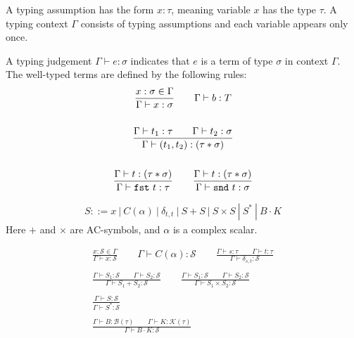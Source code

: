 \begin{definition}
  A typing assumption has the form $x : \tau$, meaning variable $x$ has the type $\tau$. A typing context $\Gamma$ consists of typing assumptions and each variable appears only once.

  A typing judgement $\Gamma \vdash e : \sigma$ indicates that $e$ is a term of type $\sigma$ in context $\Gamma$. The well-typed terms are defined by the following rules:
  \begin{gather*}
    \frac{x : \sigma \in \Gamma}{\Gamma \vdash x : \sigma}
    \qquad 
    \Gamma \vdash b : T\\
    \\
    \frac{\Gamma \vdash t_1 : \tau \qquad \Gamma \vdash t_2 : \sigma}{\Gamma \vdash (t_1, t_2) : ( \tau * \sigma )} \\
    \\
    \frac{\Gamma \vdash t : ( \tau * \sigma )}{\Gamma \vdash \texttt{fst}\ t : \tau}
    \qquad
    \frac{\Gamma \vdash t : ( \tau * \sigma )}{\Gamma \vdash \texttt{snd}\ t : \sigma}
  \end{gather*}


\begin{definition}
  \begin{align*}
    S ::= x\ |\ C(\alpha)\ |\ \delta_{t, t}\ |\ S + S\ |\ S \times S\ |\ S^*\ |\ B \cdot K
  \end{align*}
  Here $+$ and $\times$ are AC-symbols, and $\alpha$ is a complex scalar.
\end{definition}

\begin{definition}
  \begin{gather*}
    \frac{x : \mathcal{S} \in \Gamma}{\Gamma \vdash x : \mathcal{S}}
    \qquad 
    \Gamma \vdash C(\alpha) : \mathcal{S}
    \qquad
    \frac{\Gamma \vdash s : \tau \qquad \Gamma \vdash t : \tau}{\Gamma \vdash \delta_{s, t} : \mathcal{S}} \\
    \\
    \frac{\Gamma \vdash S_1 : \mathcal{S} \qquad \Gamma \vdash S_2 : \mathcal{S}}{\Gamma \vdash S_1 + S_2 : \mathcal{S}}
    \qquad
    \frac{\Gamma \vdash S_1 : \mathcal{S} \qquad \Gamma \vdash S_2 : \mathcal{S}}{\Gamma \vdash S_1 \times S_2 : \mathcal{S}} \\
    \\
    \frac{\Gamma \vdash S : \mathcal{S}}{\Gamma \vdash S^* : \mathcal{S}} \\
    \\
    \frac{\Gamma \vdash B : \mathcal{B}(\tau) \qquad \Gamma \vdash K : \mathcal{K}(\tau)}{\Gamma \vdash B \cdot K : \mathcal{S}}
  \end{gather*}
\end{definition}



\end{definition}
